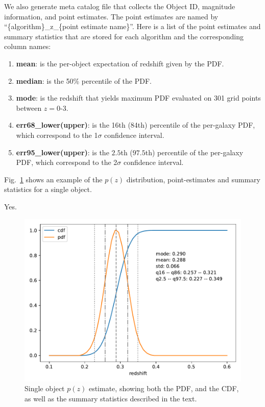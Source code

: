 We also generate meta catalog file that collects the Object ID, magnitude information, and point estimates. The point estimates are named by ``\{algorithm\}\_z\_\{point estimate name\}''.
Here is a list of the point estimates and summary statistics that are stored for each algorithm and the corresponding column names:
\begin{enumerate}
    \item \textbf{mean}: is the per-object expectation of redshift given by the PDF. 
    \item \textbf{median}: is the 50\% percentile of the PDF.
    \item \textbf{mode}: is the redshift that yields maximum PDF evaluated on 301 grid points between $z=0$-$3$. 
    \item \textbf{err68\_lower(upper)}: is the 16th (84th) percentile of the per-galaxy PDF, which correspond to the 1$\sigma$ confidence interval. 
    \item \textbf{err95\_lower(upper)}: is the $2.5$th ($97.5$th) percentile of the per-galaxy PDF, which correspond to the 2$\sigma$ confidence interval. 
\end{enumerate}
Fig.~\ref{fig:pdf} shows an example of the $p(z)$ distribution, point-estimates and summary statistics for a single object.

Yes.\begin{figure}
    \centering
    \includegraphics[width=1.0\linewidth]{figures/pdf.pdf}
    \caption{Single object $p(z)$ estimate, showing both the PDF, and the CDF, as well as the summary statistics described in the text.}
    \label{fig:pdf}
\end{figure}


